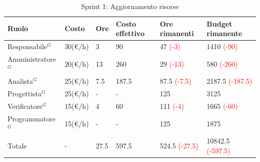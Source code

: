 \begin{table}[H]
	\centering
	\begin{tabular}{|p{}|p{}|p{}|p{}|p{}|p{}|}
		\hline
		\rowcolor{gray!25}
		Ruolo & Costo & Ore & Costo \newline effettivo & Ore \newline rimanenti & Budget \newline rimanente \\ \hline
		Responsabile$^G$   & 30(€/h) & 3 & 90 & 47 \textcolor{red}{(-3)} & 1410 \textcolor{red}{(-90)} \\ \hline
		Amministratore$^G$ & 20(€/h) & 13 & 260 & 29 \textcolor{red}{(-13)} & 580 \textcolor{red}{(-260)} \\ \hline
		Analista$^G$       & 25(€/h) & 7.5 & 187.5 & 87.5 \textcolor{red}{(-7.5)} & 2187.5 \textcolor{red}{(-187.5)} \\ \hline
		Progettista$^G$    & 25(€/h) & - & - & 125 & 3125 \\ \hline
		Verificatore$^G$   & 15(€/h) & 4 & 60 & 111 \textcolor{red}{(-4)} & 1665 \textcolor{red}{(-60)} \\ \hline
		Programmatore$^G$  & 15(€/h) & - & - & 125 & 1875 \\ \hline
		Totale         & - & 27.5 & 597.5 & 524.5 \newline \textcolor{red}{(-27.5)} & 10842.5 \newline \textcolor{red}{(-597.5)} \\ \hline
	\end{tabular}
	\caption{Sprint 1: Aggiornamento risorse}
\end{table}